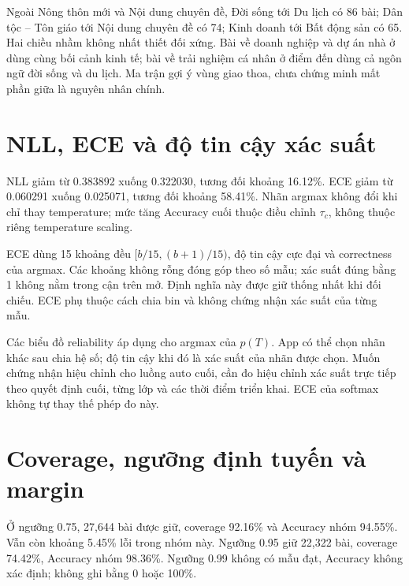 Ngoài Nông thôn mới và Nội dung chuyên đề, Đời sống tới Du lịch có 86 bài; Dân tộc -- Tôn giáo tới Nội dung chuyên đề có 74; Kinh doanh tới Bất động sản có 65. Hai chiều nhầm không nhất thiết đối xứng. Bài về doanh nghiệp và dự án nhà ở dùng cùng bối cảnh kinh tế; bài về trải nghiệm cá nhân ở điểm đến dùng cả ngôn ngữ đời sống và du lịch. Ma trận gợi ý vùng giao thoa, chưa chứng minh mất phần giữa là nguyên nhân chính.

\section{NLL, ECE và độ tin cậy xác suất}
NLL giảm từ 0.383892 xuống 0.322030, tương đối khoảng 16.12\%. ECE giảm từ 0.060291 xuống 0.025071, tương đối khoảng 58.41\%. Nhãn argmax không đổi khi chỉ thay temperature; mức tăng Accuracy cuối thuộc điều chỉnh $\tau_c$, không thuộc riêng temperature scaling.

ECE dùng 15 khoảng đều $[b/15,(b+1)/15)$, độ tin cậy cực đại và correctness của argmax. Các khoảng không rỗng đóng góp theo số mẫu; xác suất đúng bằng 1 không nằm trong cận trên mở. Định nghĩa này được giữ thống nhất khi đối chiếu. ECE phụ thuộc cách chia bin và không chứng nhận xác suất của từng mẫu.

Các biểu đồ reliability áp dụng cho argmax của $p(T)$. App có thể chọn nhãn khác sau chia hệ số; độ tin cậy khi đó là xác suất của nhãn được chọn. Muốn chứng nhận hiệu chỉnh cho luồng auto cuối, cần đo hiệu chỉnh xác suất trực tiếp theo quyết định cuối, từng lớp và các thời điểm triển khai. ECE của softmax không tự thay thế phép đo này.

\section{Coverage, ngưỡng định tuyến và margin}
Ở ngưỡng 0.75, 27,644 bài được giữ, coverage 92.16\% và Accuracy nhóm 94.55\%. Vẫn còn khoảng 5.45\% lỗi trong nhóm này. Ngưỡng 0.95 giữ 22,322 bài, coverage 74.42\%, Accuracy nhóm 98.36\%. Ngưỡng 0.99 không có mẫu đạt, Accuracy không xác định; không ghi bằng 0 hoặc 100\%.

